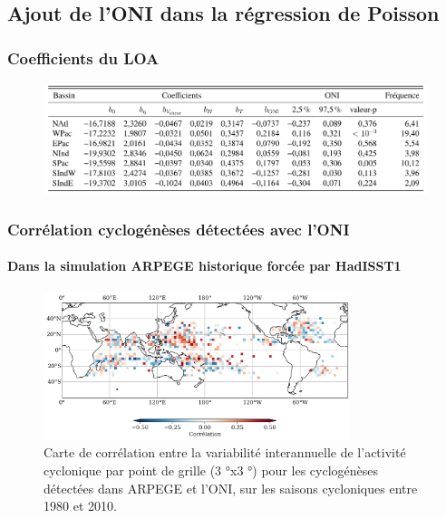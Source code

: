 \documentclass[aspectratio=169, usepdftitle=false, xcolor={dvipsnames}, 9pt,table]{beamer}
\begin{document}
\subsection*{Ajout de l'ONI dans la régression de Poisson}
\begin{frame}[c]
    \frametitle{Coefficients du LOA}
    \begin{figure}
        \centering
        \includegraphics[width=\textwidth]{Figures/Annexes/coefs_LOA.png}
    \end{figure}
\end{frame}

\begin{frame}[c]
    \frametitle{Corrélation cyclogénèses détectées avec l'ONI}
    \framesubtitle{Dans la simulation ARPEGE historique forcée par HadISST1}
    \begin{figure}
        \centering
        \includegraphics[width=0.8\textwidth]{Figures/Annexes/corr_ONI_tracks.png}
        \caption{\small Carte de corrélation entre la variabilité interannuelle de l’activité cyclonique par point de grille (3 °x3 °) pour les cyclogénèses détectées dans ARPEGE et l’ONI, sur les saisons cycloniques entre 1980 et 2010.}
    \end{figure}
\end{frame}
\end{document}
